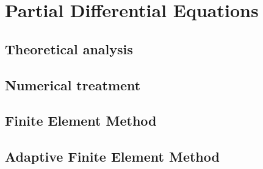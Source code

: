 \section{Partial Differential Equations}\label{sec:PDE}
\subsection{Theoretical analysis} \label{sec:theoPDE}
\subsection{Numerical treatment} \label{sec:numPDE}
\subsection{Finite Element Method} \label{sec:FE}
\subsection{Adaptive Finite Element Method} \label{sec:AdaFE}